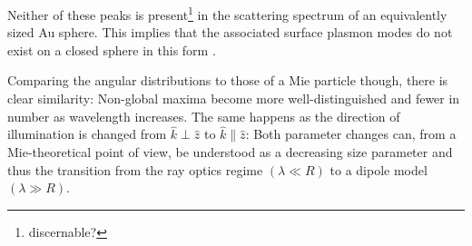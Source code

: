 \documentclass[10pt]{article}
\begin{document}
Neither of these peaks is present\footnote{discernable?} in the scattering spectrum of an equivalently sized Au sphere. 
This implies that  the associated surface plasmon modes do not exist on a closed sphere in this form . 


Comparing the angular distributions to those of a Mie particle though, there is clear similarity: 
Non-global maxima become more well-distinguished and fewer in number as wavelength increases. 
The same happens as the direction of illumination is changed from $\hat{k}\perp\hat{z}$ to $\hat{k}\parallel\hat{z}$: 
Both parameter changes can, from a Mie-theoretical point of view, be understood as a decreasing size parameter and thus the transition from the ray optics regime $\left( \lambda \ll R \right)$ to a dipole model $\left( \lambda \gg R \right)$. 
\end{document}
